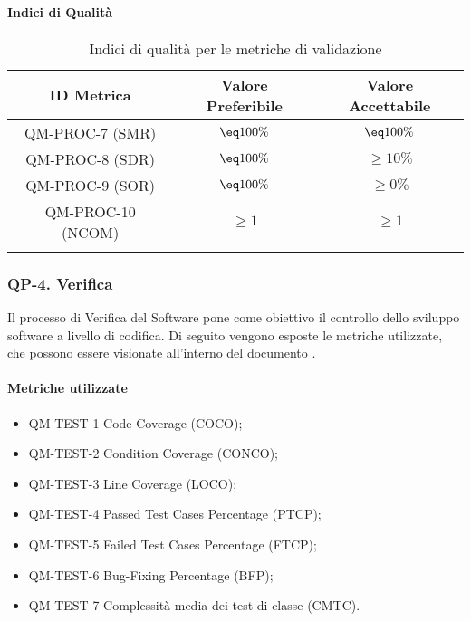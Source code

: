 		\paragraph{Indici di Qualità}

			\begin{center}
				\begin{longtable}{|c|c|c|}
				\hline
				\rowcolor{lighter-grayer}
				\textbf{ID Metrica} & \textbf{Valore Preferibile} & \textbf{Valore Accettabile}\\
				\hline
				\endfirsthead
				\hline
				QM-PROC-7 (SMR) & \(\eq 100\%\) & \(\eq 100\%\) \\
				\hline
				QM-PROC-8 (SDR) & \(\eq 100\%\) & \(\geq 10\%\) \\
				\hline
				QM-PROC-9 (SOR) & \(\eq 100\%\) & \(\geq 0\%\) \\
				\hline
				QM-PROC-10 (NCOM) & \(\geq 1\) & \(\geq 1\) \\
				\hline
				\caption{Indici di qualità per le metriche di validazione}
				\end{longtable}
			\end{center}

	\subsubsection{QP-4. Verifica}

		Il processo di Verifica del Software pone come obiettivo il controllo dello sviluppo software a livello di codifica.
		Di seguito vengono esposte le metriche utilizzate, che possono essere visionate all'interno del documento .

		\paragraph{Metriche utilizzate}

			\begin{itemize}
				\item QM-TEST-1 Code Coverage (COCO);
				\item QM-TEST-2 Condition Coverage (CONCO);
				\item QM-TEST-3 Line Coverage (LOCO);
				\item QM-TEST-4 Passed Test Cases Percentage (PTCP);
				\item QM-TEST-5 Failed Test Cases Percentage (FTCP);
				\item QM-TEST-6 Bug-Fixing Percentage (BFP);
				\item QM-TEST-7 Complessità media dei test di classe (CMTC).
			\end{itemize}


